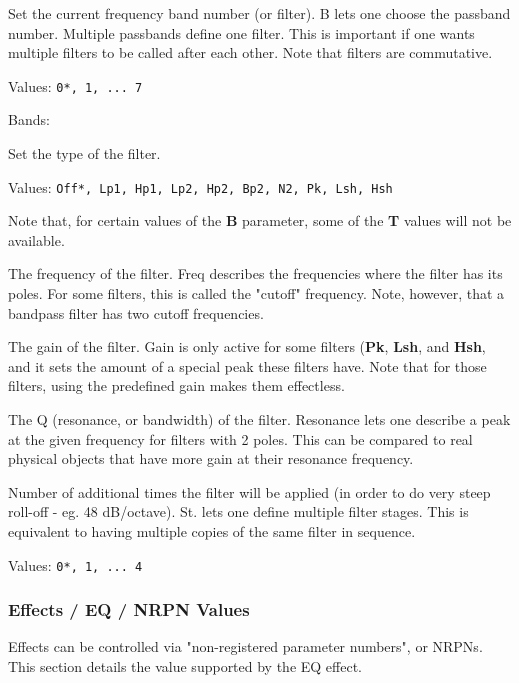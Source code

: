    Set the current frequency band number (or filter).
   B lets one choose the passband number. Multiple passbands define one
   filter. This is important if one wants multiple filters to be called
   after each other. Note that filters are commutative.

   Values: \texttt{0*, 1, ... 7}

   Bands:

   Set the type of the filter.

   Values: \texttt{Off*, Lp1, Hp1, Lp2, Hp2, Bp2, N2, Pk, Lsh, Hsh}

   Note that, for certain values of the \textbf{B} parameter, some of the
   \textbf{T} values will not be available.

   The frequency of the filter.
   Freq describes the frequencies where the filter has its poles. For some
   filters, this is called the "cutoff" frequency. Note, however, that a
   bandpass filter has two cutoff frequencies.

   The gain of the filter.
   Gain is only active for some filters
   (\textbf{Pk}, \textbf{Lsh}, and \textbf{Hsh},
   and it sets the amount of a special
   peak these filters have. Note that for those filters, using the
   predefined gain makes them effectless.

   The Q (resonance, or bandwidth) of the filter.
   Resonance lets one describe a peak at the given frequency for filters
   with 2 poles. This can be compared to real physical objects that have
   more gain at their resonance frequency.

   Number of additional times the filter will be applied (in
   order to do very steep roll-off - eg. 48 dB/octave).
   St. lets one define multiple filter stages. This is equivalent to
   having multiple copies of the same filter in sequence.

   Values: \texttt{0*, 1, ... 4}

\subsubsection{Effects / EQ / NRPN Values}
\label{subsubsec:effects_edit_eq_nrpn}

   Effects can be controlled via "non-registered parameter numbers", or NRPNs.
   This section details the value supported by the EQ effect.

